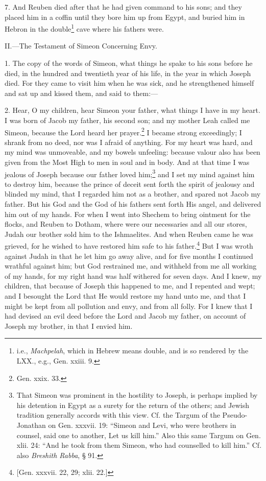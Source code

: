 7. And Reuben died after that he had given command to his sons; and they placed him in a coffin until they bore him up from Egypt, and buried him in Hebron in the double\footnote{i.e., \emph{Machpelah}, which in Hebrew means double, and is so rendered by the LXX., e.g., Gen. xxiii. 9.} cave where his fathers were.


II.—The Testament of Simeon Concerning Envy.

1. The copy of the words of Simeon, what things he spake to his sons before he died, in the hundred and twentieth year of his life, in the year in which Joseph died. For they came to visit him when he was sick, and he strengthened himself and sat up and kissed them, and said to them:—

2. Hear, O my children, hear Simeon your father, what things I have in my heart. I was born of Jacob my father, his second son; and my mother Leah called me Simeon, because the Lord heard her prayer.\footnote{Gen. xxix. 33.} I became strong exceedingly; I shrank from no deed, nor was I afraid of anything. For my heart was hard, and my mind was unmoveable, and my bowels unfeeling: because valour also has been given from the Most High to men in soul and in body. And at that time I was jealous of Joseph because our father loved him;\footnote{That Simeon was prominent in the hostility to Joseph, is perhaps implied by his detention in Egypt as a surety for the return of the others; and Jewish tradition generally accords with this view. Cf. the Targum of the Pseudo-Jonathan on Gen. xxxvii. 19: “Simeon and Levi, who were brothers in counsel, said one to another, Let us kill him.” Also this same Targum on Gen. xlii. 24: “And he took from them Simeon, who had counselled to kill him.” Cf. also \emph{Breshith Rabba}, § 91.} and I set my mind against him to destroy him, because the prince of deceit sent forth the spirit of jealousy and blinded my mind, that I regarded him not as a brother, and spared not Jacob my father. But his God and the God of his fathers sent forth His angel, and delivered him out of my hands. For when I went into Shechem to bring ointment for the flocks, and Reuben to Dotham, where were our necessaries and all our stores, Judah our brother sold him to the Ishmaelites. And when Reuben came he was grieved, for he wished to have restored him safe to his father.\footnote{[Gen. xxxvii. 22, 29; xlii. 22.]} But I was wroth against Judah in that he let him go away alive, and for five months I continued wrathful against him; but God restrained me, and withheld from me all working of my hands, for my right hand was half withered for seven days. And I knew, my children, that because of Joseph this happened to me, and I repented and wept; and I besought the Lord that He would restore my hand unto me, and that I might be kept from all pollution and envy, and from all folly. For I knew that I had devised an evil deed before the Lord and Jacob my father, on account of Joseph my brother, in that I envied him.

